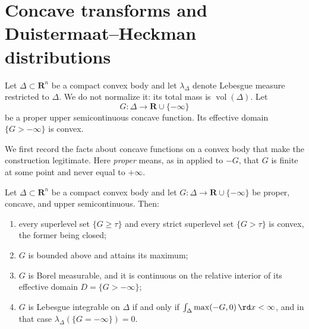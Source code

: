 \section{Concave transforms and Duistermaat--Heckman distributions}
\label{sec:dh-preview}

Let $\Delta\subset\mathbf R^n$ be a compact convex body and let
$\lambda_\Delta$ denote Lebesgue measure restricted to $\Delta$.  We do not
normalize it: its total mass is $\operatorname{vol}(\Delta)$.  Let
\[
               G:\Delta\longrightarrow\mathbf R\cup\{-\infty\}
\]
be a proper upper semicontinuous concave function.  Its effective domain
$\{G> -\infty\}$ is convex.

We first record the facts about concave functions on a convex body that make
the construction legitimate.  Here \emph{proper} means, as in
 applied to $-G$, that $G$ is finite at some
point and never equal to $+\infty$.

\begin{lemma}
\label{lem:concave-on-body}
Let $\Delta\subset\mathbf R^n$ be a compact convex body and let
$G:\Delta\to\mathbf R\cup\{-\infty\}$ be proper, concave, and upper
semicontinuous.  Then:
\begin{enumerate}
\item every superlevel set $\{G\geq\tau\}$ and every strict superlevel set
  $\{G>\tau\}$ is convex, the former being closed;
\item $G$ is bounded above and attains its maximum;
\item $G$ is Borel measurable, and it is continuous on the relative interior
  of its effective domain $D=\{G>-\infty\}$;
\item $G$ is Lebesgue integrable on $\Delta$ if and only if
  $\int_\Delta\max(-G,0)\,\rd x<\infty$, and in that case
  $\lambda_\Delta(\{G=-\infty\})=0$.
\end{enumerate}
\par
\end{lemma}


